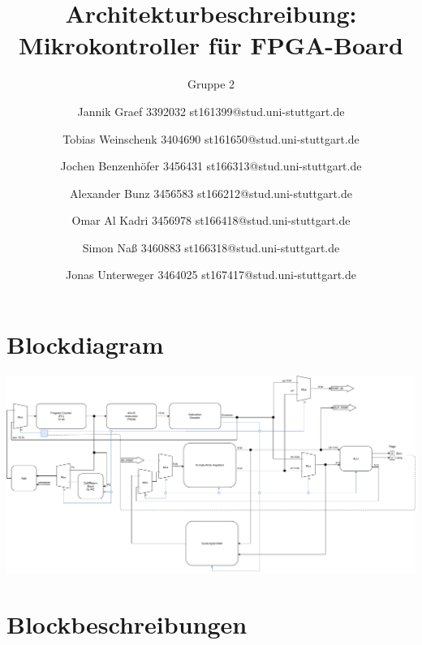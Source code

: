 \documentclass{scrartcl}
\begin{document}
\title{Architekturbeschreibung: Mikrokontroller für FPGA-Board}
\subtitle{Gruppe 2}
\author{Jannik Graef 3392032 st161399@stud.uni-stuttgart.de \and
 Tobias Weinschenk 3404690 st161650@stud.uni-stuttgart.de \and
 Jochen Benzenhöfer 3456431 st166313@stud.uni-stuttgart.de \and
 Alexander Bunz 3456583 st166212@stud.uni-stuttgart.de \and
 Omar Al Kadri 3456978 st166418@stud.uni-stuttgart.de \and
 Simon Naß 3460883 st166318@stud.uni-stuttgart.de \and
 Jonas Unterweger 3464025 st167417@stud.uni-stuttgart.de}
\maketitle


\section{Blockdiagram}
    \includegraphics[width=\textwidth, angle=0]{Blockdiagram.pdf}


\section{Blockbeschreibungen}
\end{document}
